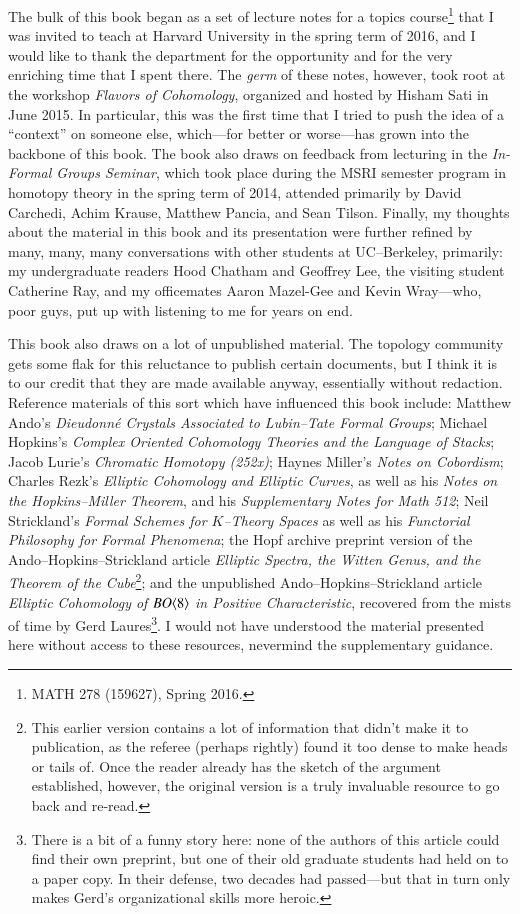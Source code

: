 The bulk of this book began as a set of lecture notes for a topics course\footnote{MATH 278 (159627), Spring 2016.} that I was invited to teach at Harvard University in the spring term of 2016, and I would like to thank the department for the opportunity and for the very enriching time that I spent there.  The \emph{germ} of these notes, however, took root at the workshop \textit{Flavors of Cohomology}, organized and hosted by Hisham Sati in June 2015.  In particular, this was the first time that I tried to push the idea of a ``context'' on someone else, which---for better or worse---has grown into the backbone of this book.  The book also draws on feedback from lecturing in the \textit{In-Formal Groups Seminar}, which took place during the MSRI semester program in homotopy theory in the spring term of 2014, attended primarily by David Carchedi, Achim Krause, Matthew Pancia, and Sean Tilson.  Finally, my thoughts about the material in this book and its presentation were further refined by many, many, many conversations with other students at UC--Berkeley, primarily: my undergraduate readers Hood Chatham and Geoffrey Lee, the visiting student Catherine Ray, and my officemates Aaron Mazel-Gee and Kevin Wray---who, poor guys, put up with listening to me for years on end.

This book also draws on a lot of unpublished material.  The topology community gets some flak for this reluctance to publish certain documents, but I think it is to our credit that they are made available anyway, essentially without redaction.  Reference materials of this sort which have influenced this book include: Matthew Ando's \textit{Dieudonn\'e Crystals Associated to Lubin--Tate Formal Groups}; Michael Hopkins's \textit{Complex Oriented Cohomology Theories and the Language of Stacks}; Jacob Lurie's \textit{Chromatic Homotopy (252x)}; Haynes Miller's \textit{Notes on Cobordism}; Charles Rezk's \textit{Elliptic Cohomology and Elliptic Curves}, as well as his \textit{Notes on the Hopkins--Miller Theorem}, and his \textit{Supplementary Notes for Math 512}; Neil Strickland's \textit{Formal Schemes for $K$--Theory Spaces} as well as his \textit{Functorial Philosophy for Formal Phenomena}; the Hopf archive preprint version of the Ando--Hopkins--Strickland article \textit{Elliptic Spectra, the Witten Genus, and the Theorem of the Cube}\footnote{This earlier version contains a lot of information that didn't make it to publication, as the referee (perhaps rightly) found it too dense to make heads or tails of.  Once the reader already has the sketch of the argument established, however, the original version is a truly invaluable resource to go back and re-read.}; and the unpublished Ando--Hopkins--Strickland article \textit{Elliptic Cohomology of $BO\langle8\rangle$ in Positive Characteristic}, recovered from the mists of time by Gerd Laures\footnote{There is a bit of a funny story here: none of the authors of this article could find their own preprint, but one of their old graduate students had held on to a paper copy.  In their defense, two decades had passed---but that in turn only makes Gerd's organizational skills more heroic.}.  I would not have understood the material presented here without access to these resources, nevermind the supplementary guidance.

